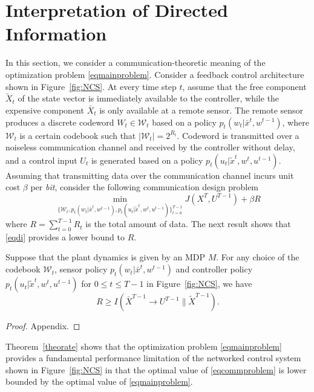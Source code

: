 \section{Interpretation of Directed Information}
In this section, we consider a communication-theoretic meaning of the optimization problem \eqref{eqmainproblem}. Consider a feedback control architecture shown in Figure~\ref{fig:NCS}. 
At every time step $t$, assume that the free component $\tilde{X}_t$ of the state vector is immediately available to the controller, while the expensive component $\bar{X}_t$ is only available at a remote sensor. The remote sensor produces a discrete codeword $W_t\in\mathcal{W}_t$ based on a policy $p_t(w_t|\bar{x}^t, w^{t-1})$, where $\mathcal{W}_t$ is a certain codebook such that $|\mathcal{W}_t|=2^{R_t}$. Codeword is transmitted over a noiseless communication channel and received by the controller without delay, and a control input $U_t$ is generated based on a policy $p_t(u_t|\tilde{x}^t, w^t, u^{t-1})$.
Assuming that transmitting data over the communication channel incurs unit cost $\beta$ per \emph{bit}, consider the following communication design problem
\begin{equation}
\min_{\{\mathcal{W}_t, p_t(w_t|\bar{x}^t, w^{t-1}), p_t(u_t|\tilde{x}^t, w^t, u^{t-1}) \}_{t=0}^{T-1}}  J(X^T, U^{T-1}) +\beta R \label{eqcommproblem}
\end{equation}
where $R=\sum_{t=0}^{T-1}R_t$ is the total amount of data. 
The next result shows that \eqref{eqdi} provides a lower bound to $R$.
\begin{theorem}
\label{theorate}
Suppose that the plant dynamics is given by an MDP $M$. For any choice of the codebook $\mathcal{W}_t$, sensor policy $p_t(w_t|\bar{x}^t, w^{t-1})$ and controller policy $p_t(u_t|\tilde{x}^t, w^t, u^{t-1})$ for $0\leq t\leq T-1$ in Figure~\ref{fig:NCS}, we have
\[
R \geq I(\bar{X}^{T-1}\rightarrow U^{T-1}\| \tilde{X}^{T-1}).
\]
\end{theorem}
\begin{proof}
Appendix.
\end{proof}
Theorem~\ref{theorate} shows that the optimization problem \eqref{eqmainproblem} provides a fundamental performance limitation of the networked control system shown in Figure~\ref{fig:NCS} in that the optimal value of \eqref{eqcommproblem} is lower bounded by the optimal value of \eqref{eqmainproblem}.




